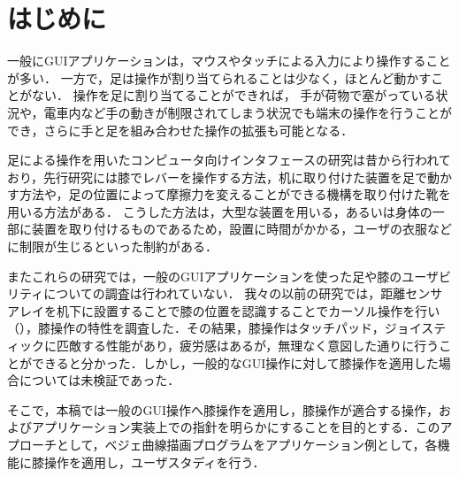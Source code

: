\documentclass[submit, techrep]{ipsj}
\begin{document}
\section{はじめに}
一般にGUIアプリケーションは，マウスやタッチによる入力により操作することが多い．
一方で，足は操作が割り当てられることは少なく，ほとんど動かすことがない．
操作を足に割り当てることができれば，
手が荷物で塞がっている状況\cite{Fan:2017:ESF:3123021.3123043}や，電車内など手の動きが制限されてしまう状況\cite{Fukahori:2015:ESF:2702123.2702308}でも端末の操作を行うことができ，さらに手と足を組み合わせた操作の拡張も可能となる．\par
足による操作を用いたコンピュータ向けインタフェースの研究は昔から行われており，先行研究には膝でレバーを操作する方法\cite{1698228}，机に取り付けた装置を足で動かす方法\cite{Pearson:1986:MMD:22627.22392, Pearson:1988:EEP:57167.57169}や，足の位置によって摩擦力を変えることができる機構を取り付けた靴\cite{Horodniczy:2017:FHE:3025453.3025625}を用いる方法がある．
こうした方法は，大型な装置を用いる，あるいは身体の一部に装置を取り付けるものであるため，設置に時間がかかる，ユーザの衣服などに制限が生じるといった制約がある．\par
またこれらの研究では，一般のGUIアプリケーションを使った足や膝のユーザビリティについての調査は行われていない．
我々の以前の研究\cite{weko_196526_1}では，距離センサアレイを机下に設置することで膝の位置を認識することでカーソル操作を行い（），膝操作の特性を調査した．その結果，膝操作はタッチパッド，ジョイスティックに匹敵する性能があり，疲労感はあるが，無理なく意図した通りに行うことができると分かった．しかし，一般的なGUI操作に対して膝操作を適用した場合については未検証であった．\par
そこで，本稿では一般のGUI操作へ膝操作を適用し，膝操作が適合する操作，およびアプリケーション実装上での指針を明らかにすることを目的とする．このアプローチとして，ベジェ曲線描画プログラムをアプリケーション例として，各機能に膝操作を適用し，ユーザスタディを行う．
\end{document}
